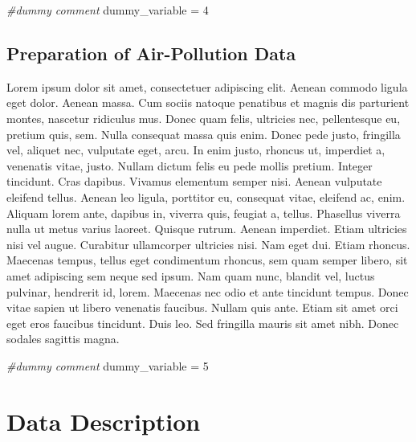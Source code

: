 \documentclass[]{book}
\newenvironment{Shaded}{\begin{snugshade}}{\end{snugshade}}
\newcommand{\DecValTok}[1]{\textcolor[rgb]{0.00,0.00,0.81}{#1}}
\newcommand{\StringTok}[1]{\textcolor[rgb]{0.31,0.60,0.02}{#1}}
\newcommand{\CommentTok}[1]{\textcolor[rgb]{0.56,0.35,0.01}{\textit{#1}}}
\newcommand{\NormalTok}[1]{#1}
\begin{document}
\begin{Shaded}
\begin{Highlighting}[]
\CommentTok{#dummy comment }
\NormalTok{dummy_variable =}\StringTok{ }\DecValTok{4}
\end{Highlighting}
\end{Shaded}

\section{Preparation of Air-Pollution
Data}\label{preparation-of-air-pollution-data}

Lorem ipsum dolor sit amet, consectetuer adipiscing elit. Aenean commodo
ligula eget dolor. Aenean massa. Cum sociis natoque penatibus et magnis
dis parturient montes, nascetur ridiculus mus. Donec quam felis,
ultricies nec, pellentesque eu, pretium quis, sem. Nulla consequat massa
quis enim. Donec pede justo, fringilla vel, aliquet nec, vulputate eget,
arcu. In enim justo, rhoncus ut, imperdiet a, venenatis vitae, justo.
Nullam dictum felis eu pede mollis pretium. Integer tincidunt. Cras
dapibus. Vivamus elementum semper nisi. Aenean vulputate eleifend
tellus. Aenean leo ligula, porttitor eu, consequat vitae, eleifend ac,
enim. Aliquam lorem ante, dapibus in, viverra quis, feugiat a, tellus.
Phasellus viverra nulla ut metus varius laoreet. Quisque rutrum. Aenean
imperdiet. Etiam ultricies nisi vel augue. Curabitur ullamcorper
ultricies nisi. Nam eget dui. Etiam rhoncus. Maecenas tempus, tellus
eget condimentum rhoncus, sem quam semper libero, sit amet adipiscing
sem neque sed ipsum. Nam quam nunc, blandit vel, luctus pulvinar,
hendrerit id, lorem. Maecenas nec odio et ante tincidunt tempus. Donec
vitae sapien ut libero venenatis faucibus. Nullam quis ante. Etiam sit
amet orci eget eros faucibus tincidunt. Duis leo. Sed fringilla mauris
sit amet nibh. Donec sodales sagittis magna.

\begin{Shaded}
\begin{Highlighting}[]
\CommentTok{#dummy comment}
\NormalTok{dummy_variable =}\StringTok{ }\DecValTok{5}
\end{Highlighting}
\end{Shaded}

\chapter{Data Description}\label{data-description}
\end{document}
